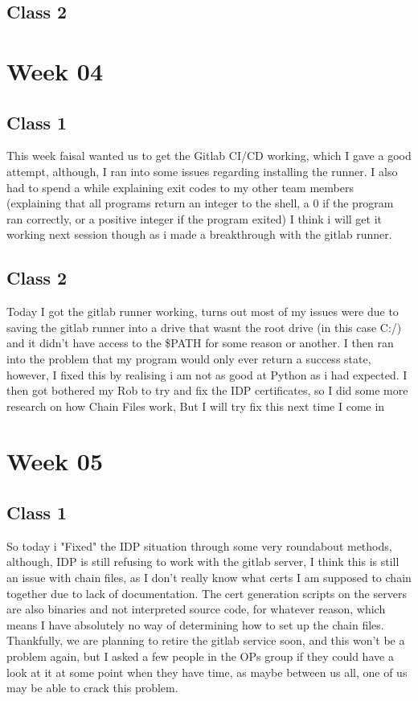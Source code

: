 \documentclass{article}
\begin{document}
\subsection{Class 2}

\section{Week 04}
\subsection{Class 1}
This week faisal wanted us to get the Gitlab CI/CD working, which I gave a good attempt, although, I ran into some issues regarding
installing the runner. I also had to spend a while explaining exit codes to my other team members (explaining that all programs return
an integer to the shell, a 0 if the program ran correctly, or a positive integer if the program exited) I think i will get it working next
session though as i made a breakthrough with the gitlab runner.
\subsection{Class 2}
Today I got the gitlab runner working, turns out most of my issues were due to saving the gitlab runner into a drive that wasnt the 
root drive (in this case C:/) and it didn't have access to the \$PATH for some reason or another. I then ran into the problem that my program
would only ever return a success state, however, I fixed this by realising i am not as good at Python as i had expected. I then got bothered
my Rob to try and fix the IDP certificates, so I did some more research on how Chain Files work, But I will try fix this next time I come in
\section{Week 05}
\subsection{Class 1}
So today i "Fixed" the IDP situation through some very roundabout methods, although, IDP is still refusing to work with the gitlab server, I
think this is still an issue with chain files, as I don't really know what certs I am supposed to chain together due to lack of documentation.
The cert generation scripts on the servers are also binaries and not interpreted source code, for whatever reason, which means I have absolutely
no way of determining how to set up the chain files. Thankfully, we are planning to retire the gitlab service soon, and this won't be a problem
again, but I asked a few people in the OPs group if they could have a look at it at some point when they have time, as maybe between us all, 
one of us may be able to crack this problem.
\end{document}

